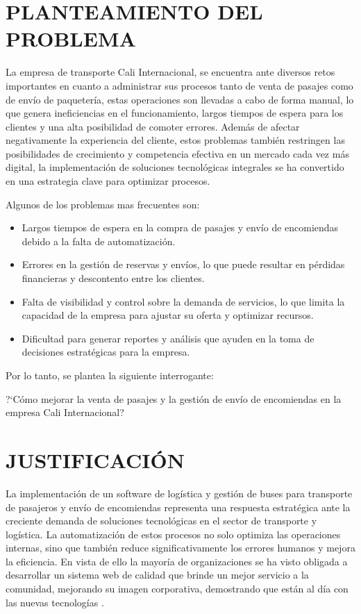 \section{PLANTEAMIENTO DEL PROBLEMA}

	La empresa de transporte Cali Internacional, se encuentra ante diversos retos importantes en cuanto a administrar sus procesos tanto de venta de pasajes como de envío de paquetería, estas operaciones son llevadas a cabo de forma manual, lo que genera ineficiencias en el funcionamiento, largos tiempos de espera para los clientes y una alta posibilidad de comoter errores. Además de afectar negativamente la experiencia del cliente, estos problemas también restringen las posibilidades de crecimiento y competencia efectiva en un mercado cada vez más digital, la implementación de soluciones tecnológicas integrales se ha convertido en una estrategia clave para optimizar procesos.  
	
	Algunos de los problemas mas frecuentes son:
	
	\begin{itemize}[label=$\bullet$, left=1.25cm, labelsep = 0.75cm, topsep = 0pt, parsep = 0pt]
		\item Largos tiempos de espera en la compra de pasajes y envío de encomiendas debido a la falta de automatización.
		\item Errores en la gestión de reservas y envíos, lo que puede resultar en pérdidas financieras y descontento entre los clientes.
		\item Falta de visibilidad y control sobre la demanda de servicios, lo que limita la capacidad de la empresa para ajustar su oferta y optimizar recursos.
		\item Dificultad para generar reportes y análisis que ayuden en la toma de decisiones estratégicas para la empresa.    
	\end{itemize}
	
	Por lo tanto, se plantea la siguiente interrogante:
	
	?`Cómo mejorar la venta de pasajes y la gestión de envío de encomiendas en la empresa Cali Internacional?
	
\section{JUSTIFICACIÓN}

	La implementación de un software de logística y gestión de buses para transporte de pasajeros y envío de encomiendas representa una respuesta estratégica ante la creciente demanda de soluciones tecnológicas en el sector de transporte y logística. La automatización de estos procesos no solo optimiza las operaciones internas, sino que también reduce significativamente los errores humanos y mejora la eficiencia. En vista de ello la mayoría de organizaciones se ha visto obligada a desarrollar un sistema web de calidad que brinde un mejor servicio a la comunidad, mejorando su imagen corporativa, demostrando que están al día con las nuevas tecnologías \parencite{nunez2005diseno}.
	
